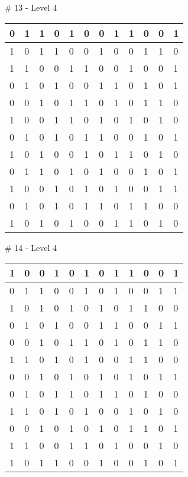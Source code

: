 \smallskip

\# 13 - Level 4 \newline
\begin{tabular}{|m{\collen}|m{\collen}|m{\collen}|m{\collen}|m{\collen}|m{\collen}|m{\collen}|m{\collen}|m{\collen}|m{\collen}|m{\collen}|m{\collen}|}
\hline
  0 & 1 & 1 & 0 & 1 & 0 & 0 & 1 & 1 & 0 & 0 & 1 \\
\hline
  1 & 0 & 1 & 1 & 0 & 0 & 1 & 0 & 0 & 1 & 1 & 0 \\
\hline
  1 & 1 & 0 & 0 & 1 & 1 & 0 & 0 & 1 & 0 & 0 & 1 \\
\hline
  0 & 1 & 0 & 1 & 0 & 0 & 1 & 1 & 0 & 1 & 0 & 1 \\
\hline
  0 & 0 & 1 & 0 & 1 & 1 & 0 & 1 & 0 & 1 & 1 & 0 \\
\hline
  1 & 0 & 0 & 1 & 1 & 0 & 1 & 0 & 1 & 0 & 1 & 0 \\
\hline
  0 & 1 & 0 & 1 & 0 & 1 & 1 & 0 & 0 & 1 & 0 & 1 \\
\hline
  1 & 0 & 1 & 0 & 0 & 1 & 0 & 1 & 1 & 0 & 1 & 0 \\
\hline
  0 & 1 & 1 & 0 & 1 & 0 & 1 & 0 & 0 & 1 & 0 & 1 \\
\hline
  1 & 0 & 0 & 1 & 0 & 1 & 0 & 1 & 0 & 0 & 1 & 1 \\
\hline
  0 & 1 & 0 & 1 & 0 & 1 & 1 & 0 & 1 & 1 & 0 & 0 \\
\hline
  1 & 0 & 1 & 0 & 1 & 0 & 0 & 1 & 1 & 0 & 1 & 0 \\
\hline
\end{tabular}


\smallskip

\# 14 - Level 4 \newline
\begin{tabular}{|m{\collen}|m{\collen}|m{\collen}|m{\collen}|m{\collen}|m{\collen}|m{\collen}|m{\collen}|m{\collen}|m{\collen}|m{\collen}|m{\collen}|}
\hline
  1 & 0 & 0 & 1 & 0 & 1 & 0 & 1 & 1 & 0 & 0 & 1 \\
\hline
  0 & 1 & 1 & 0 & 0 & 1 & 0 & 1 & 0 & 0 & 1 & 1 \\
\hline
  1 & 0 & 1 & 0 & 1 & 0 & 1 & 0 & 1 & 1 & 0 & 0 \\
\hline
  0 & 1 & 0 & 1 & 0 & 0 & 1 & 1 & 0 & 0 & 1 & 1 \\
\hline
  0 & 0 & 1 & 0 & 1 & 1 & 0 & 1 & 0 & 1 & 1 & 0 \\
\hline
  1 & 1 & 0 & 1 & 0 & 1 & 0 & 0 & 1 & 1 & 0 & 0 \\
\hline
  0 & 0 & 1 & 0 & 1 & 0 & 1 & 0 & 1 & 0 & 1 & 1 \\
\hline
  0 & 1 & 0 & 1 & 1 & 0 & 1 & 1 & 0 & 1 & 0 & 0 \\
\hline
  1 & 1 & 0 & 1 & 0 & 1 & 0 & 0 & 1 & 0 & 1 & 0 \\
\hline
  0 & 0 & 1 & 0 & 1 & 0 & 1 & 0 & 1 & 1 & 0 & 1 \\
\hline
  1 & 1 & 0 & 0 & 1 & 1 & 0 & 1 & 0 & 0 & 1 & 0 \\
\hline
  1 & 0 & 1 & 1 & 0 & 0 & 1 & 0 & 0 & 1 & 0 & 1 \\
\hline
\end{tabular}


